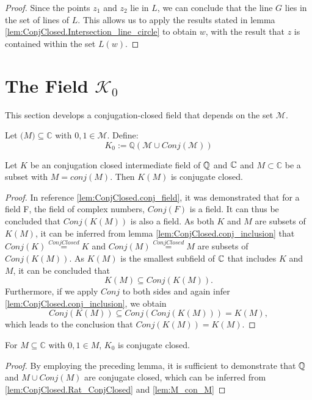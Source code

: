 \begin{proof}
        Since the points $z_1$ and $z_2$ lie in $L$, we can conclude that the line $G$ lies in the set of lines of $L$. This allows us to apply the results stated in lemma \ref{lem:ConjClosed.Intersection_line_circle} to obtain $w$, with the result that $z$ is contained within the set $L(w)$.
\end{proof}

\section[K zero]{The Field $\mathcal{K}_0$}
This section develops a conjugation-closed field that depends on the set $\mathcal{M}$.
\begin{definition}
    \label{def:K_M_0}
    \leanok
    Let $\mathcal(M)\subseteq\mathbb{C}$ with $0,1 \in \mathcal{M}$. Define:
    \begin{equation*}
        K_0 := \mathbb{Q}(\mathcal{M}\cup Conj(\mathcal{M}))
    \end{equation*}
\end{definition}

\begin{lemma}
    \label{lem:conj_adjion}
    \leanok
    Let $K$ be an conjugation closed intermediate field of $\mathbb{Q}$ and $\mathbb{C}$ and $ M \subset \mathbb{C}$ be a subset with $M = conj(M)$. Then
    $K(M)$ is conjugate closed.
\end{lemma}
\begin{proof}
    \leanok
    In reference \ref{lem:ConjClosed.conj_field}, it was demonstrated that for a field F, the field of complex numbers, $Conj(F)$ is a field. 
    It can thus be concluded that $Conj(K(M))$ is also a field.
    As both $K$ and $M$ are subsets of $K(M)$, it can be inferred from lemma \ref{lem:ConjClosed.conj_inclusion} that $Conj(K) \overset{ConjClosed}{=} K$ and $Conj(M) \overset{ConjClosed}{=} M$ are subsets of $Conj(K(M))$. 
    As $K(M)$ is the smallest subfield of $\mathbb{C}$ that includes $K$ and $M$, it can be concluded that $$K(M) \subseteq Conj(K(M)).$$
    Furthermore, if we apply $Conj$ to both sides and again infer \ref{lem:ConjClosed.conj_inclusion}, we obtain $$Conj(K(M)) \subseteq Conj(Conj(K(M))) = K(M),$$ 
    which leads to the conclusion that $Conj(K(M)) = K(M)$.
\end{proof}

\begin{corollary}
    \label{cor:K_zero_conjectClosed}
    \leanok
    For $M\subseteq \mathbb{C}$ with $0,1 \in M$, $K_0$ is conjugate closed.
\end{corollary}
\begin{proof}
    \leanok
    By employing the preceding lemma, it is sufficient to demonstrate that $\mathbb{Q}$ and $M \cup Conj(M)$ are conjugate closed,
    which can be inferred from \ref{lem:ConjClosed.Rat_ConjClosed} and \ref{lem:M_con_M}
\end{proof}

